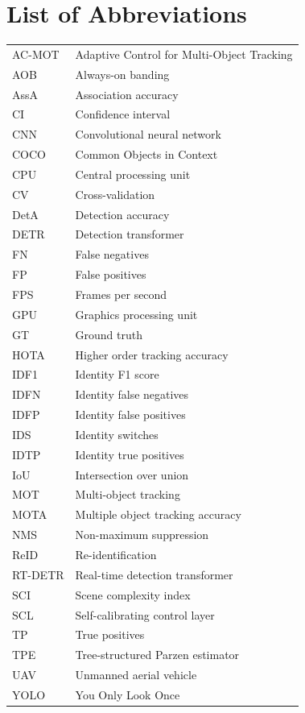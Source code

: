 \chapter*{List of Abbreviations}

\begin{longtable}{ll}
AC-MOT & Adaptive Control for Multi-Object Tracking \\
AOB & Always-on banding \\
AssA & Association accuracy \\
CI & Confidence interval \\
CNN & Convolutional neural network \\
COCO & Common Objects in Context \\
CPU & Central processing unit \\
CV & Cross-validation \\
DetA & Detection accuracy \\
DETR & Detection transformer \\
FN & False negatives \\
FP & False positives \\
FPS & Frames per second \\
GPU & Graphics processing unit \\
GT & Ground truth \\
HOTA & Higher order tracking accuracy \\
IDF1 & Identity F1 score \\
IDFN & Identity false negatives \\
IDFP & Identity false positives \\
IDS & Identity switches \\
IDTP & Identity true positives \\
IoU & Intersection over union \\
MOT & Multi-object tracking \\
MOTA & Multiple object tracking accuracy \\
NMS & Non-maximum suppression \\
ReID & Re-identification \\
RT-DETR & Real-time detection transformer \\
SCI & Scene complexity index \\
SCL & Self-calibrating control layer \\
TP & True positives \\
TPE & Tree-structured Parzen estimator \\
UAV & Unmanned aerial vehicle \\
YOLO & You Only Look Once \\
\end{longtable}
